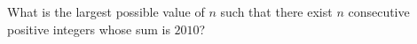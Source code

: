 What is the largest possible value of $n$ such that there exist $n$ consecutive positive integers whose sum is $2010$?

